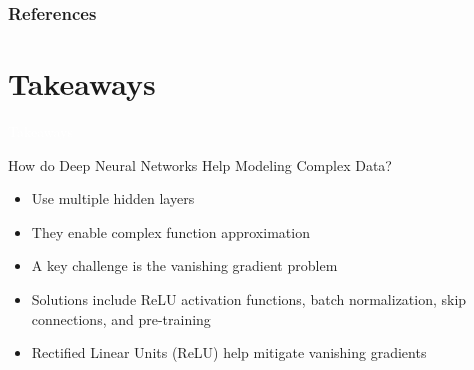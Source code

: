 \documentclass[11pt,table]{beamer}
\begin{document}
\begin{frame}[t,allowframebreaks
]%
\frametitle{References}
\small

\end{frame}
\section{Takeaways}
{
\begin{frame}
\centering
\Huge
\textcolor{white}{Takeaways}
\thispagestyle{empty}
\end{frame}
}

\begin{frame}{How do Deep Neural Networks Help Modeling Complex Data?}

\begin{itemize}
    \item Use multiple hidden layers
    \item They enable complex function approximation
    \item A key challenge is the vanishing gradient problem
    \item Solutions include ReLU activation functions, batch normalization, skip connections, and pre-training
    \item Rectified Linear Units (ReLU) help mitigate vanishing gradients 
\end{itemize}
\end{frame}
\end{document}
